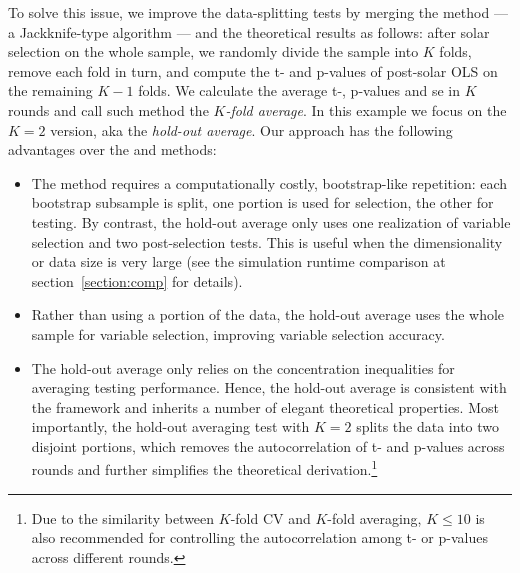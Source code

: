 \documentclass[12pt]{article}
\begin{document}
To solve this issue, we improve the data-splitting tests by merging the \citet{bousquet2002stability} method --- a Jackknife-type algorithm ---  and the \citet{diciccio2020exact} theoretical results as follows: after solar selection on the whole sample, we randomly divide the sample into $K$ folds, remove each fold in turn, and compute the t- and p-values of post-solar OLS on the remaining $K-1$ folds. We calculate the average t-, p-values and se in $K$ rounds and call such method the \emph{$K$-fold average}. In this example we focus on the $K=2$ version, aka the \emph{hold-out average}. Our approach has the following advantages over the \citet{wasserman2009high} and \citet{meinshausen2009p} methods:

\begin{itemize}
  \item The \citet{meinshausen2009p} method requires a computationally costly, bootstrap-like repetition: each bootstrap subsample is split, one portion is used for selection, the  other for testing. By contrast, the hold-out average only uses one realization of variable selection and two post-selection tests. This is useful when the dimensionality or data size is very large (see the simulation runtime comparison at section~\ref{section:comp} for details).
  \item Rather than using a portion of the data, the hold-out average uses the whole sample for variable selection, improving variable selection accuracy.
  \item The hold-out average only relies on the concentration inequalities for averaging testing performance. Hence, the hold-out average is consistent with the \citet{diciccio2020exact} framework and inherits a number of elegant theoretical properties. Most importantly, the hold-out averaging test with $K=2$ splits the data into two disjoint portions, which removes the autocorrelation of t- and p-values across rounds and further simplifies the \citet{diciccio2020exact} theoretical derivation.\footnote{Due to the similarity between $K$-fold CV and $K$-fold averaging, $K \leqslant 10$ \citep{friedman2001elements} is also recommended for controlling the autocorrelation among t- or p-values across different rounds.}
\end{itemize}
\end{document}
